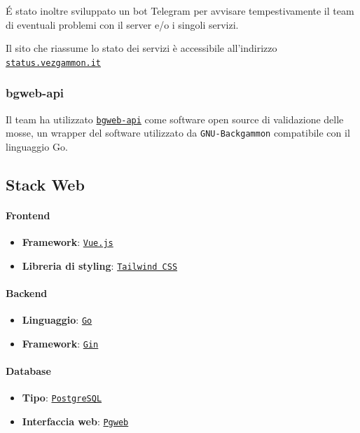 \documentclass{article}
\begin{document}
\'E stato inoltre sviluppato un bot Telegram per avvisare tempestivamente il team di eventuali problemi con il server 
e/o i singoli servizi.

Il sito che riassume lo stato dei servizi è accessibile all'indirizzo \href{https://status.vezgammon.it}{\texttt{status.vezgammon.it}}

\subsubsection{bgweb-api}
Il team ha utilizzato \href{https://github.com/foochu/bgweb-api}{\texttt{bgweb-api}} come software open source di validazione delle mosse, 
un wrapper del software utilizzato da \texttt{GNU-Backgammon} compatibile con il linguaggio Go.

\subsection{Stack Web}

\paragraph{Frontend}
\begin{itemize}
    \item \textbf{Framework}: \href{https://vuejs.org/}{\texttt{Vue.js}}
    \item \textbf{Libreria di styling}: \href{https://tailwindcss.com/}{\texttt{Tailwind CSS}}
\end{itemize}

\paragraph{Backend}
\begin{itemize}
    \item \textbf{Linguaggio}: \href{https://go.dev/}{\texttt{Go}}
    \item \textbf{Framework}: \href{https://gin-gonic.com/}{\texttt{Gin}}
\end{itemize}

\paragraph{Database}
\begin{itemize}
    \item \textbf{Tipo}: \href{https://www.postgresql.org/}{\texttt{PostgreSQL}}
    \item \textbf{Interfaccia web}: \href{https://github.com/sosedoff/pgweb}{\texttt{Pgweb}}
\end{itemize}
\end{document}
